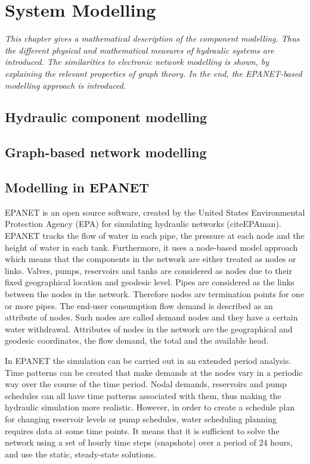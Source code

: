 \chapter{System Modelling}
\label{system_modelling}

\emph{This chapter gives a mathematical description of the component modelling. Thus the different physical and mathematical measures of hydraulic systems are introduced. The similarities to electronic network modelling is shown, by explaining the relevant properties of graph theory. In the end, the EPANET-based modelling approach is introduced.}

\section{Hydraulic component modelling}
\label{hydraulic_component_modelling}

\section{Graph-based network modelling}
\label{graph_based_network_modelling}

\section{Modelling in EPANET}
\label{modelling_in_epanet}

EPANET is an open source software, created by the United States Environmental Protection Agency (EPA) for simulating hydraulic networks (citeEPAman). EPANET tracks the flow of water in each pipe, the pressure at each node and the height of water in each tank. Furthermore, it uses a node-based model approach which means that the components in the network are either treated as nodes or links. Valves, pumps, reservoirs and tanks are considered as nodes due to their fixed geographical location and geodesic level. Pipes are considered as the links between the nodes in the network. Therefore nodes are termination points for one or more pipes. The end-user consumption flow demand is described as an attribute of nodes. Such nodes are called demand nodes and they have a certain water withdrawal. Attributes of nodes in the network are the geographical and geodesic coordinates, the flow demand, the total and the available head.  

In EPANET the simulation can be carried out in an extended period analysis. Time patterns can be created that make demands at the nodes vary in a periodic way over the course of the time period. Nodal demands, reservoirs and pump schedules can all have time patterns associated with them, thus making the hydraulic simulation more realistic. However, in order to create a schedule plan for changing reservoir levels or pump schedules, water scheduling planning requires data at some time points. It means that it is sufficient to solve the network using a set of hourly time steps (snapshots) over a period of 24 hours, and use the static, steady-state solutions. 











